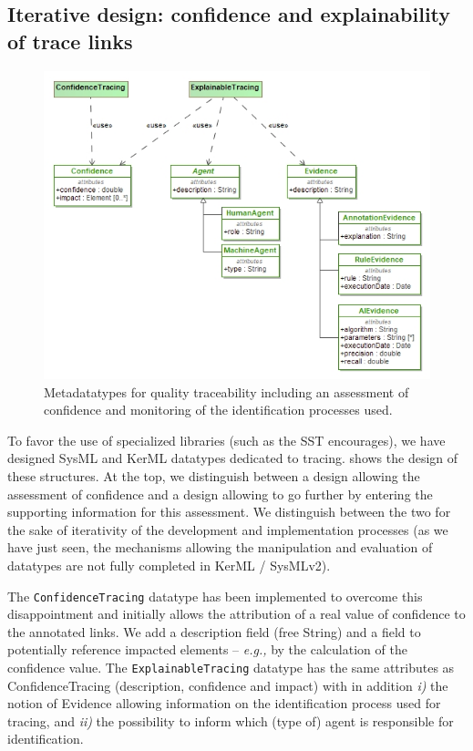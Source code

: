 \subsection{Iterative design: confidence and explainability of trace links}\label{sec:design}
\begin{figure}[ht]      
	\centering
	\includegraphics[width=.9\linewidth]{images/explainability-datatype.jpg}
	\caption{Metadatatypes for quality traceability including an assessment of confidence and monitoring of the identification processes used.}
	\label{fig:datatypes}
\end{figure}

To favor the use of specialized libraries (such as the SST encourages), we have designed SysML and KerML datatypes dedicated to tracing. 
 shows the design of these structures. At the top, we distinguish between a design allowing the assessment of confidence and a design allowing to go further by entering the supporting information for this assessment.
We distinguish between the two for the sake of iterativity of the development and implementation processes (as we have just seen, the mechanisms allowing the manipulation and evaluation of datatypes are not fully completed in KerML / SysMLv2).

The \texttt{ConfidenceTracing} datatype has been implemented to overcome this disappointment and initially allows the attribution of a real value of confidence to the annotated links. We add a description field (free String) and a field to potentially reference impacted elements -- \textit{e.g.,} by the calculation of the confidence value.
The \texttt{ExplainableTracing} datatype has the same attributes as ConfidenceTracing (description, confidence and impact) with in addition \textit{i)} the notion of Evidence allowing information on the identification process used for tracing, and \textit{ii)} the possibility to inform which (type of) agent is responsible for identification.

